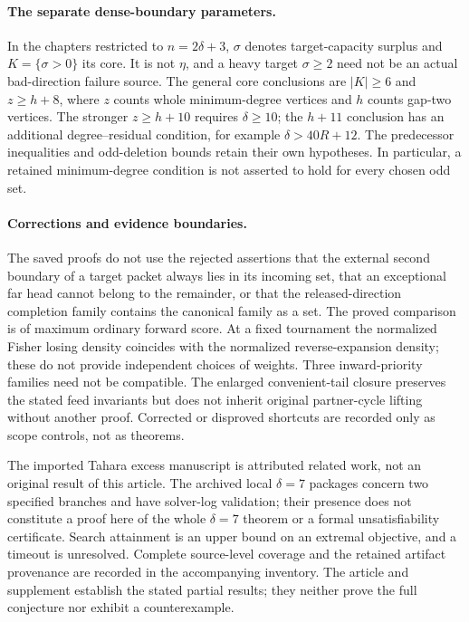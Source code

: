 \paragraph{The separate dense-boundary parameters.}
In the chapters restricted to \(n=2\delta+3\), \(\sigma\) denotes
target-capacity surplus and \(K=\{\sigma>0\}\) its core. It is not
\(\eta\), and a heavy target \(\sigma\ge2\) need not be an actual
bad-direction failure source. The general core conclusions are
\(|K|\ge6\) and \(z\ge h+8\), where \(z\) counts whole
minimum-degree vertices and \(h\) counts gap-two vertices.
The stronger \(z\ge h+10\) requires \(\delta\ge10\); the
\(h+11\) conclusion has an additional degree--residual condition,
for example \(\delta>40R+12\). The predecessor inequalities and
odd-deletion bounds retain their own hypotheses. In particular, a
retained minimum-degree condition is not asserted to hold for every
chosen odd set.

\paragraph{Corrections and evidence boundaries.}
The saved proofs do not use the rejected assertions that the external
second boundary of a target packet always lies in its incoming set,
that an exceptional far head cannot belong to the remainder, or that
the released-direction completion family contains the canonical family
as a set. The proved comparison is of maximum ordinary forward score.
At a fixed tournament the normalized Fisher losing density coincides
with the normalized reverse-expansion density; these do not provide
independent choices of weights. Three inward-priority families need not
be compatible. The enlarged convenient-tail closure preserves the
stated feed invariants but does not inherit original partner-cycle
lifting without another proof. Corrected or disproved shortcuts are
recorded only as scope controls, not as theorems.

The imported Tahara excess manuscript is attributed related work, not
an original result of this article. The archived local \(\delta=7\)
packages concern two specified branches and have solver-log validation;
their presence does not constitute a proof here of the whole
\(\delta=7\) theorem or a formal unsatisfiability certificate. Search
attainment is an upper bound on an extremal objective, and a timeout is
unresolved. Complete source-level coverage and the retained artifact
provenance are recorded in the accompanying inventory. The article and
supplement establish the stated partial results; they neither prove the
full conjecture nor exhibit a counterexample.
